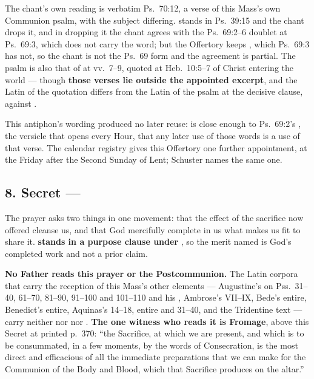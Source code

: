 The chant's own reading is verbatim Ps.~70:12, a verse of this Mass's own
Communion psalm, with the subject differing.  stands in Ps.~39:15
and the chant drops it, and in dropping it the chant agrees with the Ps.~69:2--6
doublet at Ps.~69:3, which does not carry the word; but the Offertory keeps
, which Ps.~69:3 has not, so the chant is not the
Ps.~69 form and the agreement is partial. The psalm is also that of  at vv.~7--9, quoted at Heb.~10:5--7 of
Christ entering the world --- though \textbf{those verses lie outside the
appointed excerpt}, and the Latin of the quotation differs from the Latin of the
psalm at the decisive clause,  against
.

This antiphon's wording produced no later reuse:  is close enough to Ps.~69:2's ,
the versicle that opens every Hour, that any later use of those words is a use
of that verse. The calendar registry gives this Offertory one further
appointment, at the Friday after the Second Sunday of Lent; Schuster names the
same one.

\subsection*{8. Secret  --- }

The prayer asks two things in one movement: that the effect of the sacrifice now
offered cleanse us, and that God mercifully complete in us what makes us fit to
share it. \textbf{ stands in a purpose clause under
}, so the merit named is God's completed work
and not a prior claim.

\textbf{No Father reads this prayer or the Postcommunion.} The Latin corpora
that carry the reception of this Mass's other elements --- Augustine's
 on Pss.~31--40, 61--70, 81--90, 91--100 and 101--110 and his
, Ambrose's  VII--IX, Bede's
 entire, Benedict's  entire, Aquinas's  14--18,  entire and  31--40,
and the Tridentine text --- carry neither  nor
 nor . \textbf{The one witness
who reads it is Fromage}, above this Secret at printed p.~370: ``the Sacrifice,
at which we are present, and which is to be consummated, in a few moments, by the
words of Consecration, is the most direct and efficacious of all the immediate
preparations that we can make for the Communion of the Body and Blood, which that
Sacrifice produces on the altar.''

